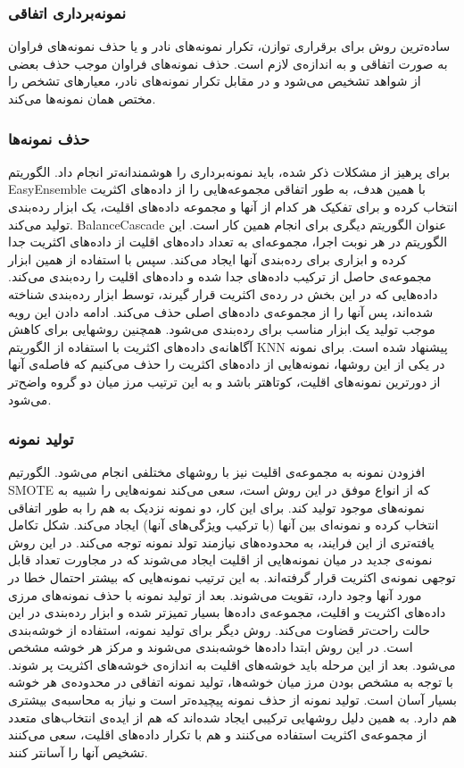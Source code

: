 \documentclass{article}
\begin{document}
\subsubsection{نمونه‌برداری اتفاقی}
ساده‌ترین روش برای برقراری توازن، تکرار نمونه‌های نادر و یا حذف نمونه‌های فراوان به صورت اتفاقی و به اندازه‌ی لازم است. حذف نمونه‌های فراوان موجب حذف بعضی از شواهد تشخیص می‌شود و در مقابل تکرار نمونه‌های نادر، معیارهای تشخص را مختص همان نمونه‌ها می‌کند.

\subsubsection{حذف نمونه‌ها}
برای پرهیز از مشکلات ذکر شده، باید نمونه‌برداری را هوشمندانه‌تر انجام داد. الگوریتم EasyEnsemble با همین هدف، به طور اتفاقی مجموعه‌هایی را از داده‌های اکثریت انتخاب کرده و برای تفکیک هر کدام از آنها و مجموعه داده‌های اقلیت، یک ابزار رده‌بندی تولید می‌کند. BalanceCascade عنوان الگوریتم دیگری برای انجام همین کار است. این الگوریتم در هر نوبت اجرا، مجموعه‌ای به تعداد داده‌های اقلیت از داده‌های اکثریت جدا کرده و ابزاری برای رده‌بندی آنها ایجاد می‌کند. سپس با استفاده از همین ابزار مجموعه‌ی حاصل از ترکیب داده‌های جدا شده و داده‌های اقلیت را رده‌بندی می‌کند. داده‌هایی که در این بخش در رده‌ی اکثریت قرار گیرند، توسط ابزار رده‌بندی شناخته شده‌اند، پس آنها را از مجموعه‌ی داده‌های اصلی حذف می‌کند. ادامه دادن این رویه موجب تولید یک ابزار مناسب برای رده‌بندی می‌شود.
همچنین روشهایی برای کاهش آگاهانه‌ی داده‌های اکثریت با استفاده از الگوریتم KNN پیشنهاد شده است. برای نمونه در یکی از این روشها، نمونه‌هایی از داده‌های اکثریت را حذف می‌کنیم که فاصله‌ی آنها از دورترین نمونه‌های اقلیت، کوتاهتر باشد و به این ترتیب مرز میان دو گروه واضح‌تر می‌شود.

\subsubsection{تولید نمونه}
افزودن نمونه به مجموعه‌ی اقلیت نیز با روشهای مختلفی انجام می‌شود. الگورتیم SMOTE که از انواع موفق در این روش است، سعی می‌کند نمونه‌هایی را شبیه به نمونه‌های موجود تولید کند. برای این کار، دو نمونه نزدیک به هم را به طور اتفاقی انتخاب کرده و نمونه‌ای بین آنها (با ترکیب ویژگی‌های آنها) ایجاد می‌کند.
شکل تکامل یافته‌تری از این فرایند، به محدوده‌های نیازمند تولد نمونه توجه می‌کند. در این روش نمونه‌ی جدید در میان نمونه‌هایی از اقلیت ایجاد می‌شوند که در مجاورت تعداد قابل توجهی نمونه‌ی اکثریت قرار گرفته‌اند. به این ترتیب نمونه‌هایی که بیشتر احتمال خطا در مورد آنها وجود دارد، تقویت می‌شوند. بعد از تولید نمونه با حذف نمونه‌های مرزی داده‌های اکثریت و اقلیت، مجموعه‌ی داده‌ها بسیار تمیزتر شده و ابزار رده‌بندی در این حالت راحت‌تر قضاوت می‌کند.
روش دیگر برای تولید نمونه، استفاده از خوشه‌بندی است. در این روش ابتدا داده‌ها خوشه‌بندی می‌شوند و مرکز هر خوشه مشخص می‌شود. بعد از این مرحله باید خوشه‌های اقلیت به اندازه‌ی خوشه‌های اکثریت پر شوند. با توجه به مشخص بودن مرز میان خوشه‌ها، تولید نمونه اتفاقی در محدوده‌ی هر خوشه بسیار آسان است.
تولید نمونه از حذف نمونه پیچیده‌تر است و نیاز به محاسبه‌ی بیشتری هم دارد. به همین دلیل روشهایی ترکیبی ایجاد شده‌اند که هم از ایده‌ی انتخاب‌های متعدد از مجموعه‌ی اکثریت استفاده می‌کنند و هم با تکرار داده‌های اقلیت، سعی می‌کنند تشخیص آنها را آسانتر کنند.
\end{document}
